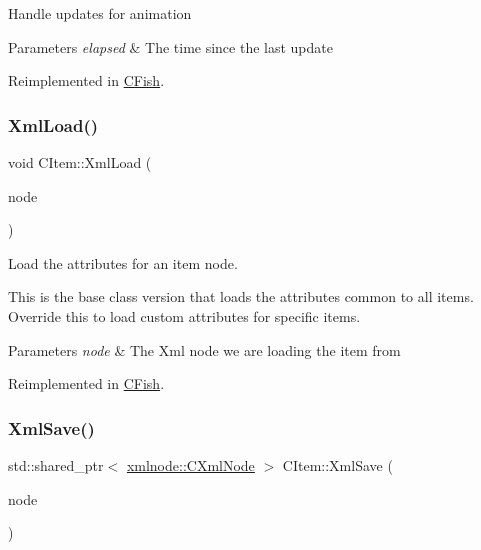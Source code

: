 Handle updates for animation 
\begin{DoxyParams}{Parameters}
{\em elapsed} & The time since the last update \\
\hline
\end{DoxyParams}


Reimplemented in \mbox{\hyperlink{class_c_fish_a1f32288b28d3c1f186bd51cf8ac71aeb}{C\+Fish}}.

\mbox{\label{class_c_item_ad0bad7d47a01ff133734b5498f9ca3bb}} 
\subsubsection{\texorpdfstring{Xml\+Load()}{XmlLoad()}}
{\footnotesize\ttfamily void C\+Item\+::\+Xml\+Load (\begin{DoxyParamCaption}\item[{const std\+::shared\+\_\+ptr$<$ \mbox{\hyperlink{classxmlnode_1_1_c_xml_node}{xmlnode\+::\+C\+Xml\+Node}} $>$ \&}]{node }\end{DoxyParamCaption})\hspace{0.3cm}{\ttfamily [virtual]}}

Load the attributes for an item node.

This is the base class version that loads the attributes common to all items. Override this to load custom attributes for specific items.


\begin{DoxyParams}{Parameters}
{\em node} & The Xml node we are loading the item from \\
\hline
\end{DoxyParams}


Reimplemented in \mbox{\hyperlink{class_c_fish_a997f243d89dd8c397597010eec4b611e}{C\+Fish}}.

\mbox{\label{class_c_item_a10584fa8e05d3abe125f95f0ceecdedd}} 
\subsubsection{\texorpdfstring{Xml\+Save()}{XmlSave()}}
{\footnotesize\ttfamily std\+::shared\+\_\+ptr$<$ \mbox{\hyperlink{classxmlnode_1_1_c_xml_node}{xmlnode\+::\+C\+Xml\+Node}} $>$ C\+Item\+::\+Xml\+Save (\begin{DoxyParamCaption}\item[{const std\+::shared\+\_\+ptr$<$ \mbox{\hyperlink{classxmlnode_1_1_c_xml_node}{xmlnode\+::\+C\+Xml\+Node}} $>$ \&}]{node }\end{DoxyParamCaption})\hspace{0.3cm}{\ttfamily [virtual]}}



